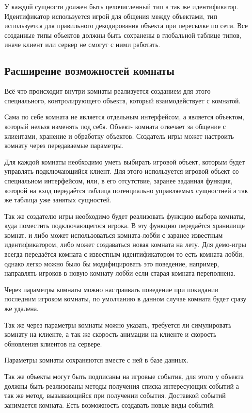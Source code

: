 \documentclass[a4paper,14pt, openany]{book}
\begin{document}
У каждой сущности должен быть целочисленный тип а так же идентификатор. Идентификатор используется игрой для общения между объектами, тип используется для правильного декодирования объекта при пересылке по сети. Все созданные типы объектов должны быть сохранены в глобальной таблице типов, иначе клиент или сервер не смогут с ними работать.

\subsection{Расширение возможностей комнаты}

Всё что происходит внутри комнаты реализуется созданием для этого специального, контролирующего объекта, который взаимодействует с комнатой. 

Сама по себе комната не является отдельным интерфейсом, а является объектом, который нельзя изменять под себя. Объект- комната отвечает за общение с клиентами, хранение и обработку объектов. Создатель игры может настроить комнату через передаваемые параметры.

Для каждой комнаты необходимо уметь выбирать игровой объект, которым будет управлять подключающийся клиент. Для этого используется игровой объект со специальном интерфейсом, или, в его отсутствие, заранее заданная функция, которой на вход передаётся таблица потенциально управляемых сущностней а так же таблица уже занятых сущностей.  

Так же создателю игры необходимо будет реализовать функцию выбора комнаты, куда поместить подключающегося игрока. В эту функцию передаётся хранилище комнат. и либо может использоваться комната-лобби с заранее известным идентификатором, либо может создаваться новая комната на лету. Для демо-игры всегда передаётся комната с известным идентификатором то есть комната-лобби, однако легко можно было бы модифицировать это поведение, например, направлять игроков в новую комнату-лобби если старая комната переполнена. 

Через параметры комнаты можно настраивать поведение при покидании последним игроком комнаты, по умолчанию в данном случае комната будет сразу же удалена. 

Так же через параметры комнаты можно указать, требуется ли симулировать комнату на клиенте, а так же скорость анимации на клиенте и скорость обновления клиентов на сервере.

Параметры комнаты сохраняются вместе с ней в базе данных.

Так же объекты могут быть подписаны на игровые события, для этого у объекта должны быть реализованы методы получения списка интересующих событий а так же метод, вызывающийся при получении события. Доставкой событий занимается комната. Есть возможность создавать новые виды событий. 
\end{document}
